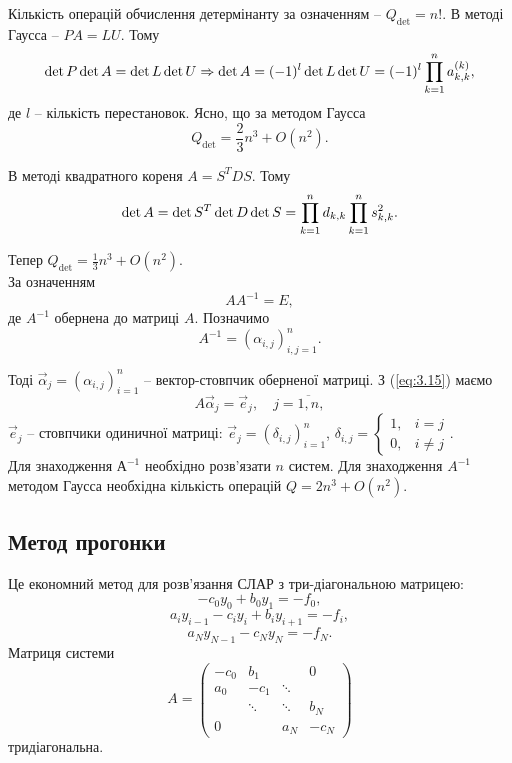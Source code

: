 Кількість операцій обчислення детермінанту за означенням -- $Q_{\det} = n!$. В методі Гаусса -- $PA = LU$. Тому 
\begin{equation}
	\label{eq:3.13} 
	\det P \det A = \det L \det U \Rightarrow \det A = (-1)^l \det L \det U = (-1)^l \displaystyle\prod\limits_{k=1}^n a_{k,k}^{(k)},
\end{equation}
де $l$ -- кількість перестановок. Ясно, що за методом Гаусса \[Q_{\det} = \dfrac 23 n^3 + O (n^2) .\]

В методі квадратного кореня $A = S^T D S$. Тому 
\begin{equation}
	\label{eq:3.14}
	\det A = \det S^T \det D \det S = \displaystyle\prod\limits_{k=1}^n d_{k,k} \displaystyle\prod\limits_{k=1}^n s_{k,k}^2.
\end{equation}

Тепер $Q_{\det} = \frac 13 n^3 + O(n^2)$. \\

За означенням 
\begin{equation}
	\label{eq:3.15}
	AA^{-1} = E,
\end{equation}
де $A^{-1}$ обернена до матриці $A$. Позначимо
\[ A^{-1} = (\alpha_{i,j})_{i,j=1}^n.\] 

Тоді $\vec \alpha_j = (\alpha_{i,j})_{i=1}^n$ -- вектор-стовпчик оберненої матриці. З (\ref{eq:3.15}) маємо
\begin{equation}
	\label{eq:3.16}
	A \vec \alpha_j = \vec e_j, \quad j = \overline{1, n},
\end{equation}
$\vec e_j$ -- стовпчики одиничної матриці: $\vec e_j = (\delta_{i,j})_{i=1}^n$, $\delta_{i,j} = \begin{cases} 1, & i = j \\ 0, & i \ne j \end{cases}$. \\

Для знаходження $А^{-1}$ необхідно розв'язати $n$ систем. Для знаходження $A^{-1}$ методом Гаусса необхідна кількість операцій $Q = 2n^3 + O(n^2)$.

\subsection{Метод прогонки}

Це економний метод для розв'язання СЛАР з три-діагональною матрицею:
\begin{equation}
	\label{eq:3.17}
	-c_0 y_0 + b_0 y_1 = - f_0,
\end{equation}
\begin{equation}
	\label{eq:3.18}
	a_i y_{i-1} - c_i y_i + b_i y_{i+1} = -f_i,
\end{equation}
\begin{equation}
	\label{eq:3.19}
	a_N y_{N-1} - c_N y_N = -f_N.
\end{equation}
Матриця системи
\[ A = \begin{pmatrix} -c_0 & b_1 & & 0 \\ a_0 & -c_1 & \ddots & \\ & \ddots & \ddots & b_N \\ 0 & & a_N & -c_N \end{pmatrix}\]
тридіагональна. \\

